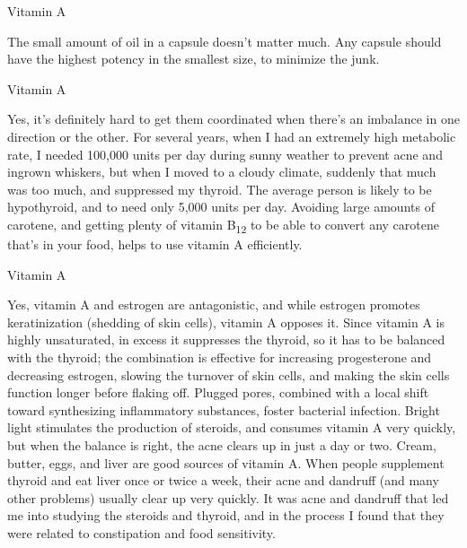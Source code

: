 \documentclass[11pt,oneside,openany,extrafontsizes]{memoir}
\begin{document}
\begin{standalonequote}{Vitamin A}

    \begin{answer}
        The small amount of oil in a capsule doesn't matter much. Any capsule should have the highest potency in the smallest size, to minimize the junk.
    \end{answer}
\end{standalonequote}

\begin{standalonequote}{Vitamin A}

    \begin{answer}
        Yes, it's definitely hard to get them coordinated when there's an imbalance in one direction or the other. For several years, when I had an extremely high metabolic rate, I needed 100,000 units per day during sunny weather to prevent acne and ingrown whiskers, but when I moved to a cloudy climate, suddenly that much was too much, and suppressed my thyroid. The average person is likely to be hypothyroid, and to need only 5,000 units per day. Avoiding large amounts of carotene, and getting plenty of vitamin B\textsubscript{12} to be able to convert any carotene that's in your food, helps to use vitamin A efficiently.
    \end{answer}
\end{standalonequote}

\begin{standalonequote}{Vitamin A}

    \begin{answer}
        Yes, vitamin A and estrogen are antagonistic, and while estrogen promotes keratinization (shedding of skin cells), vitamin A opposes it. Since vitamin A is highly unsaturated, in excess it suppresses the thyroid, so it has to be balanced with the thyroid; the combination is effective for increasing progesterone and decreasing estrogen, slowing the turnover of skin cells, and making the skin cells function longer before flaking off. Plugged pores, combined with a local shift toward synthesizing inflammatory substances, foster bacterial infection. Bright light stimulates the production of steroids, and consumes vitamin A very quickly, but when the balance is right, the acne clears up in just a day or two. Cream, butter, eggs, and liver are good sources of vitamin A. When people supplement thyroid and eat liver once or twice a week, their acne and dandruff (and many other problems) usually clear up very quickly. It was acne and dandruff that led me into studying the steroids and thyroid, and in the process I found that they were related to constipation and food sensitivity.
    \end{answer}
\end{standalonequote}
\end{document}
